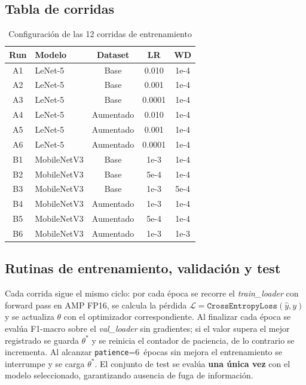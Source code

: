 \documentclass[conference]{IEEEtran}
\begin{document}
\subsection{Tabla de corridas}

\begin{table}[htbp]
\caption{Configuración de las 12 corridas de entrenamiento}
\label{tab:runs}
\centering
\begin{tabular}{clccc}
\toprule
\textbf{Run} & \textbf{Modelo} & \textbf{Dataset} & \textbf{LR} & \textbf{WD} \\
\midrule
A1 & LeNet-5 & Base      & 0.010  & 1e-4 \\
A2 & LeNet-5 & Base      & 0.001  & 1e-4 \\
A3 & LeNet-5 & Base      & 0.0001 & 1e-4 \\
A4 & LeNet-5 & Aumentado & 0.010  & 1e-4 \\
A5 & LeNet-5 & Aumentado & 0.001  & 1e-4 \\
A6 & LeNet-5 & Aumentado & 0.0001 & 1e-4 \\
\midrule
B1 & MobileNetV3 & Base      & 1e-3 & 1e-4 \\
B2 & MobileNetV3 & Base      & 5e-4 & 1e-4 \\
B3 & MobileNetV3 & Base      & 1e-3 & 5e-4 \\
B4 & MobileNetV3 & Aumentado & 1e-3 & 1e-4 \\
B5 & MobileNetV3 & Aumentado & 5e-4 & 1e-4 \\
B6 & MobileNetV3 & Aumentado & 1e-3 & 1e-3 \\
\bottomrule
\end{tabular}
\end{table}

\subsection{Rutinas de entrenamiento, validación y test}

Cada corrida sigue el mismo ciclo: por cada época se recorre el
\textit{train\_loader} con forward pass en AMP FP16, se calcula la pérdida
$\mathcal{L}=\texttt{CrossEntropyLoss}(\hat{y},y)$ y se actualiza $\theta$
con el optimizador correspondiente.  Al finalizar cada época se evalúa
F1-macro sobre el \textit{val\_loader} sin gradientes; si el valor supera
el mejor registrado se guarda $\theta^*$ y se reinicia el contador de
paciencia, de lo contrario se incrementa.  Al alcanzar
\texttt{patience}=6~épocas sin mejora el entrenamiento se interrumpe y se
carga $\theta^*$.  El conjunto de test se evalúa \textbf{una única vez}
con el modelo seleccionado, garantizando ausencia de fuga de información.
\end{document}
